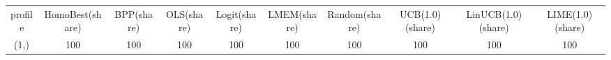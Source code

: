 \begin{tabular}{cccccccccc}
profile & HomoBest(share) & BPP(share) & OLS(share) & Logit(share) & LMEM(share) & Random(share) & UCB(1.0)(share) & LinUCB(1.0)(share) & LIME(1.0)(share)\\
(1,) & 100 & 100 & 100 & 100 & 100 & 100 & 100 & 100 & 100\\
\end{tabular}
